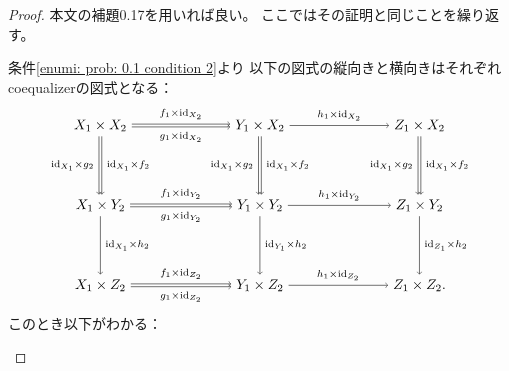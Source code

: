 \documentclass[uplatex]{jsarticle}
\theoremstyle{definition}
\def\id{\mathrm{id}}
\begin{document}
\begin{proof}
  本文の補題0.17を用いれば良い。
  ここではその証明と同じことを繰り返す。

  条件\ref{enumi: prob: 0.1 condition 2}より
  以下の図式の縦向きと横向きはそれぞれcoequalizerの図式となる：
  \[
  \begin{tikzpicture}[auto]
    \node (A) at (0,4) {\(X_1\times X_2\)};
    \node (B) at (4,4) {\(Y_1\times X_2\)};
    \node (C) at (8,4) {\(Z_1\times X_2\)};
    \node (A') at (0,2) {\(X_1\times Y_2\)};
    \node (B') at (4,2) {\(Y_1\times Y_2\)};
    \node (C') at (8,2) {\(Z_1\times Y_2\)};
    \node (A'') at (0,0) {\(X_1\times Z_2\)};
    \node (B'') at (4,0) {\(Y_1\times Z_2\)};
    \node (C'') at (8,0) {\(Z_1\times Z_2.\)};
    \draw[->,transform canvas={yshift=1pt}] (A) to node {\(\scriptstyle f_1\times \id_{X_2}\)} (B);
    \draw[->,transform canvas={yshift=-1pt}] (A) to node[swap] {\(\scriptstyle g_1\times \id_{X_2}\)} (B);
    \draw[->] (B) to node {\(\scriptstyle h_1\times \id_{X_2}\)} (C);
    \draw[->,transform canvas={yshift=1pt}] (A') to node {\(\scriptstyle f_1\times \id_{Y_2}\)} (B');
    \draw[->,transform canvas={yshift=-1pt}] (A') to node[swap] {\(\scriptstyle g_1\times \id_{Y_2}\)} (B');
    \draw[->] (B') to node {\(\scriptstyle h_1\times \id_{Y_2}\)} (C');
    \draw[->,transform canvas={yshift=1pt}] (A'') to node {\(\scriptstyle f_1\times \id_{Z_2}\)} (B'');
    \draw[->,transform canvas={yshift=-1pt}] (A'') to node[swap] {\(\scriptstyle g_1\times \id_{Z_2}\)} (B'');
    \draw[->] (B'') to node {\(\scriptstyle h_1\times \id_{Z_2}\)} (C'');
    \draw[->,transform canvas={xshift=1pt}] (A) to node {\(\scriptstyle \id_{X_1}\times f_2\)} (A');
    \draw[->,transform canvas={xshift=-1pt}] (A) to node[swap] {\(\scriptstyle \id_{X_1}\times g_2\)} (A');
    \draw[->] (A') to node {\(\scriptstyle \id_{X_1}\times h_2\)} (A'');
    \draw[->,transform canvas={xshift=1pt}] (B) to node {\(\scriptstyle \id_{X_1}\times f_2\)} (B');
    \draw[->,transform canvas={xshift=-1pt}] (B) to node[swap] {\(\scriptstyle \id_{X_1}\times g_2\)} (B');
    \draw[->] (B') to node {\(\scriptstyle \id_{Y_1}\times h_2\)} (B'');
    \draw[->,transform canvas={xshift=1pt}] (C) to node {\(\scriptstyle \id_{X_1}\times f_2\)} (C');
    \draw[->,transform canvas={xshift=-1pt}] (C) to node[swap] {\(\scriptstyle \id_{X_1}\times g_2\)} (C');
    \draw[->] (C') to node {\(\scriptstyle \id_{Z_1}\times h_2\)} (C'');
  \end{tikzpicture}
  \]
  このとき以下がわかる：
  \begin{enumerate}

\end{enumerate}
\end{proof}
\end{document}
